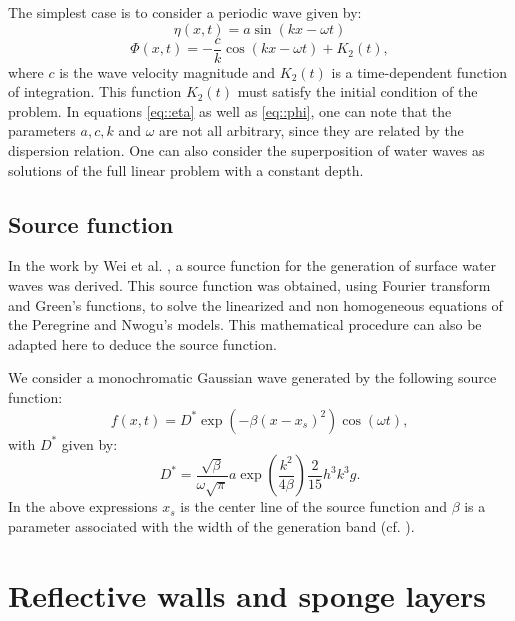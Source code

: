 The simplest case is to consider  a periodic wave given by:
\begin{equation}\label{eq::eta}
\eta(x,t)=a \sin(kx-\omega t)
\end{equation}
\begin{equation}\label{eq::phi}
\Phi(x,t)=-\frac{c}{k}\cos(k x-\omega t)+K_2(t),
\end{equation}
where \(c\) is the wave velocity magnitude and \(K_2(t)\) is a time-dependent function of integration.
This function \(K_2(t)\) must satisfy   the initial
condition of the problem.
 In equations \eqref{eq::eta} as well as \eqref{eq::phi},
 one can note that  the parameters \(a,c,k\) and \(\omega\)  are
not all arbitrary, since they are related by the dispersion relation. 
One can also consider the  superposition of water waves
as solutions of the full linear problem with a constant depth. 


\subsection{Source function}
In  the work by Wei et
al.  \cite{WeiKir99}, a source function
  for the  generation of surface water waves was derived.
This source function was obtained, using   Fourier
transform and Green's functions, to solve the  linearized and
non homogeneous equations of the   
 Peregrine \cite{Per67} and  Nwogu's \cite{Nwo93} models.
This mathematical procedure can also be  adapted here  to
deduce the source function.

We  consider  a monochromatic
Gaussian wave generated by the following source function:
\begin{equation}\label{eq::src}
f(x,t)=D^* \exp(-\beta (x-x_s)^2)\cos(\omega t), 
\end{equation}
with \(D^*\) given by:
\begin{equation}
\displaystyle D^*=\frac{\sqrt{\beta}}{\omega\sqrt{\pi}}a\exp(\frac{k^2}{4\beta})\frac{2}{15}h^3k^3g.
\end{equation}
In the above expressions
\(x_s\) is the center line of the source function and
\(\beta\)  is a parameter associated with the width of the
generation band (cf. \cite{WeiKir99}).

\section{Reflective walls and sponge layers}

